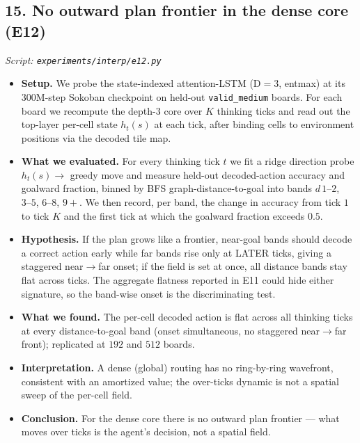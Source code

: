 \documentclass[11pt]{article}
\begin{document}
\subsection*{15. No outward plan frontier in the dense core (E12)}
\textit{Script: \texttt{experiments/interp/e12.py}}
\begin{itemize}
\item \textbf{Setup.} We probe the state-indexed attention-LSTM (D$=3$, entmax) at its $300$M-step Sokoban checkpoint on held-out \texttt{valid\_medium} boards. For each board we recompute the depth-$3$ core over $K$ thinking ticks and read out the top-layer per-cell state $h_t(s)$ at each tick, after binding cells to environment positions via the decoded tile map.
\item \textbf{What we evaluated.} For every thinking tick $t$ we fit a ridge direction probe $h_t(s)\!\to\!$ greedy move and measure held-out decoded-action accuracy and goalward fraction, binned by BFS graph-distance-to-goal into bands $d\,1\text{--}2$, $3\text{--}5$, $6\text{--}8$, $9{+}$. We then record, per band, the change in accuracy from tick $1$ to tick $K$ and the first tick at which the goalward fraction exceeds $0.5$.
\item \textbf{Hypothesis.} If the plan grows like a frontier, near-goal bands should decode a correct action early while far bands rise only at LATER ticks, giving a staggered near$\to$far onset; if the field is set at once, all distance bands stay flat across ticks. The aggregate flatness reported in E11 could hide either signature, so the band-wise onset is the discriminating test.
\item \textbf{What we found.} The per-cell decoded action is flat across all thinking ticks at every distance-to-goal band (onset simultaneous, no staggered near$\to$far front); replicated at $192$ and $512$ boards.
\item \textbf{Interpretation.} A dense (global) routing has no ring-by-ring wavefront, consistent with an amortized value; the over-ticks dynamic is not a spatial sweep of the per-cell field.
\item \textbf{Conclusion.} For the dense core there is no outward plan frontier --- what moves over ticks is the agent's decision, not a spatial field.
\end{itemize}
\clearpage
\end{document}
